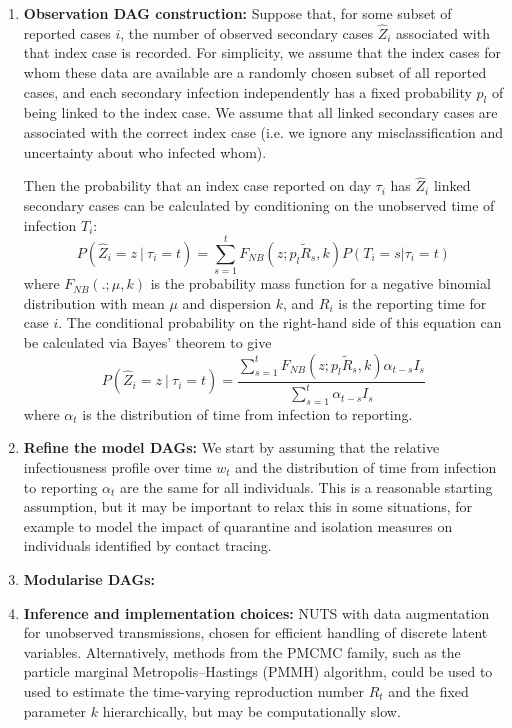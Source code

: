 \documentclass{article}
\begin{document}
\begin{enumerate}
    \item \textbf{Observation DAG construction:} Suppose that, for some subset of reported cases $i$, the number of observed secondary cases $\hat{Z}_i$ associated with that index case is recorded. For simplicity, we assume that the index cases for whom these data are available are a randomly chosen subset of all reported cases, and each secondary infection independently has a fixed probability $p_l$ of being linked to the index case. We assume that all linked secondary cases are associated with the correct index case (i.e. we ignore any misclassification and uncertainty about who infected whom). 

   Then the probability that an index case reported on day $\tau_i$ has $\hat{Z}_i$ linked secondary cases can be calculated by conditioning on the unobserved time of infection $T_i$:
   \begin{equation}
       P(\hat{Z}_i=z \ | \ \tau_i=t) = \sum_{s=1}^{t} F_{NB}(z; p_l\tilde{R}_s,k) P(T_i=s | \tau_i=t)
   \end{equation}
where $F_{NB}(.;\mu,k)$ is the probability mass function for a negative binomial distribution with mean $\mu$ and dispersion $k$, and $R_i$ is the reporting time for case $i$.  The conditional probability on the right-hand side of this equation can be calculated via Bayes' theorem to give
   \begin{equation} \label{eq:Zhat}
       P(\hat{Z}_i=z \ | \ \tau_i=t) = \frac{\sum_{s=1}^{t} F_{NB}(z; p_l\tilde{R}_s,k) \alpha_{t-s} I_s}{\sum_{s=1}^{t}\alpha_{t-s} I_s}  
   \end{equation}
 where $\alpha_t$ is the distribution of time from infection to reporting.

    \item \textbf{Refine the model DAGs:}  We start by assuming that the relative infectiousness profile over time $w_t$ and the distribution of time from infection to reporting $\alpha_t$ are the same for all individuals. This is a reasonable starting assumption, but it may be important to relax this in some situations, for example to model the impact of quarantine and isolation measures on individuals identified by contact tracing.

    \item \textbf{Modularise DAGs:} 
    
    \item \textbf{Inference and implementation choices:} NUTS with data augmentation for unobserved transmissions, chosen for efficient handling of discrete latent variables. Alternatively, methods from the PMCMC family, such as the particle marginal Metropolis–Hastings (PMMH) algorithm, could be used to used to estimate the time-varying reproduction number $R_t$ and the fixed parameter $k$ hierarchically, but may be computationally slow. 


\end{enumerate}
\end{document}
